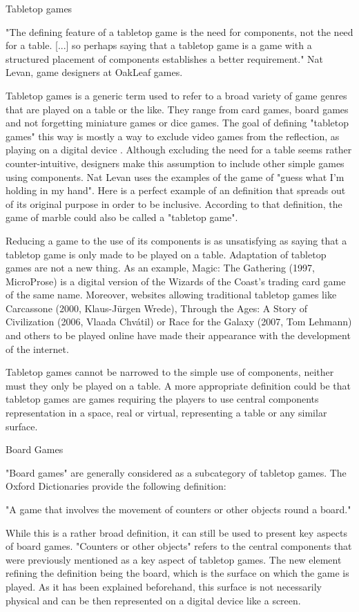 Tabletop games

"The defining feature of a tabletop game is the need for components, not the need for a table. [...] so perhaps saying that a tabletop game is a game with a structured placement of components establishes a better requirement." Nat Levan, game designers at OakLeaf games.

Tabletop games is a generic term used to refer to a broad variety of game genres that are played on a table or the like. They range from card games, board games and not forgetting miniature games or dice games. The goal of defining "tabletop games" this way is mostly a way to exclude video games from the reflection, as playing on a digital device . Although excluding the need for a table seems rather counter-intuitive, designers make this assumption to include other simple games using components. Nat Levan uses the examples of the game of "guess what I'm holding in my hand". Here is a perfect example of an definition that spreads out of its original purpose in order to be inclusive. According to that definition, the game of marble could also be called a "tabletop game". 

Reducing a game to the use of its components is as unsatisfying as saying that a tabletop game is only made to be played on a table. Adaptation of tabletop games are not a new thing. As an example, Magic: The Gathering (1997, MicroProse) is a digital version of the Wizards of the Coast's trading card game of the same name. Moreover, websites allowing traditional tabletop games like Carcassone (2000, Klaus-Jürgen Wrede), Through the Ages: A Story of Civilization (2006, Vlaada Chvátil) or Race for the Galaxy (2007, Tom Lehmann) and others to be played online have made their appearance with the development of the internet. 

Tabletop games cannot be narrowed to the simple use of components, neither must they only be played on a table. A more appropriate definition could be that tabletop games are games requiring the players to use central components representation in a space, real or virtual, representing a table or any similar surface.

Board Games

"Board games" are generally considered as a subcategory of tabletop games. The Oxford Dictionaries provide the following definition:

"A game that involves the movement of counters or other objects round a board."

While this is a rather broad definition, it can still be used to present key aspects of board games. "Counters or other objects" refers to the central components that were previously mentioned as a key aspect of tabletop games. The new element refining the definition being the board, which is the surface on which the game is played. As it has been explained beforehand, this surface is not necessarily physical and can be then represented on a digital device like a screen. 




